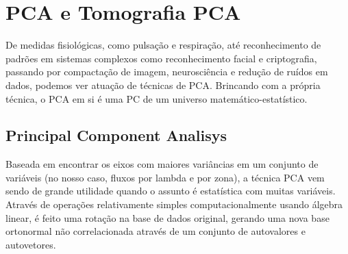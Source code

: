 


\chapter{PCA e Tomografia PCA}
\label{sec:PCAeTomoPCA}

De medidas fisiológicas, como pulsação e respiração, até reconhecimento de
padrões em sistemas complexos como reconhecimento facial e criptografia,
passando por compactação de imagem, neurosciência e redução de ruídos em dados,
podemos ver atuação de técnicas de PCA. \ojo Brincando com a própria técnica, o
PCA em si é uma PC de um universo matemático-estatístico.


\section{Principal Component Analisys}
\label{sec:PCAeTomoPCA:PCA}

Baseada em encontrar os eixos com maiores variâncias em um conjunto de variáveis
(no nosso caso, fluxos por lambda e por zona), a técnica PCA vem sendo de grande
utilidade quando o assunto é estatística com muitas variáveis. Através de
operações relativamente simples computacionalmente usando álgebra linear, é
feito uma rotação na base de dados original, gerando uma nova base ortonormal
não correlacionada através de um conjunto de autovalores e autovetores.

